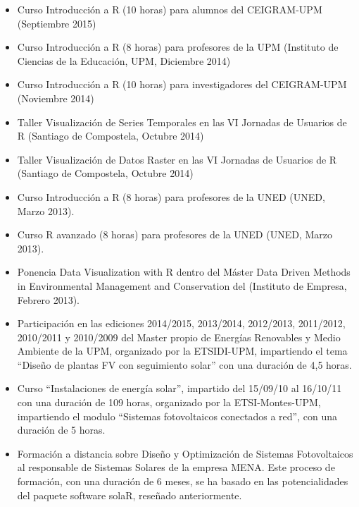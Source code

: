 \documentclass[article, a4paper]{memoir}
\begin{document}
\begin{itemize}
\item Curso \guillemotleft{}Introducción a R\guillemotright{} (10 horas) para alumnos del CEIGRAM-UPM (Septiembre 2015)

\item Curso \guillemotleft{}Introducción a R\guillemotright{} (8 horas) para profesores de la UPM (Instituto de Ciencias de la Educación, UPM, Diciembre 2014)

\item Curso \guillemotleft{}Introducción a R\guillemotright{} (10 horas) para investigadores del CEIGRAM-UPM (Noviembre 2014)

\item Taller \guillemotleft{}Visualización de Series Temporales\guillemotright{} en las VI Jornadas de Usuarios de R (Santiago de Compostela, Octubre 2014)

\item Taller \guillemotleft{}Visualización de Datos Raster\guillemotright{} en las VI Jornadas de Usuarios de R (Santiago de Compostela, Octubre 2014)

\item Curso \guillemotleft{}Introducción a R\guillemotright{} (8 horas) para profesores de la UNED (UNED, Marzo 2013).

\item Curso \guillemotleft{}R avanzado\guillemotright{} (8 horas) para profesores de la UNED (UNED, Marzo 2013).

\item Ponencia \guillemotleft{}Data Visualization with R\guillemotright{} dentro del Máster \guillemotleft{}Data Driven Methods in Environmental Management and Conservation\guillemotright{} del (Instituto de Empresa, Febrero 2013).

\item Participación en las ediciones 2014/2015, 2013/2014, 2012/2013, 2011/2012, 2010/2011 y 2010/2009 del Master propio de Energías Renovables y Medio Ambiente de la UPM, organizado por la ETSIDI-UPM, impartiendo el tema ``Diseño de plantas FV con seguimiento solar'' con una duración de 4,5 horas.

\item Curso ``Instalaciones de energía solar'', impartido del 15/09/10 al 16/10/11 con una duración de 109 horas, organizado por la ETSI-Montes-UPM, impartiendo el modulo ``Sistemas fotovoltaicos conectados a red'', con una duración de 5 horas.

\item Formación a distancia sobre Diseño y Optimización de Sistemas Fotovoltaicos al responsable de Sistemas Solares de la empresa MENA. Este proceso de formación, con una duración de 6 meses, se ha basado en las potencialidades del paquete software solaR, reseñado anteriormente.


\end{itemize}
\end{document}
